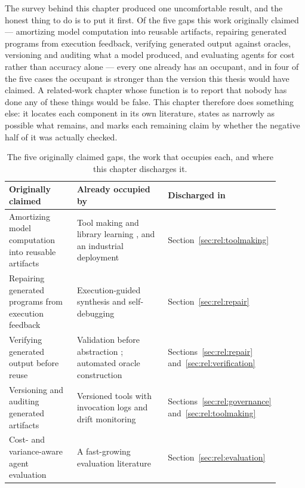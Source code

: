 The survey behind this chapter produced one uncomfortable result, and the honest thing to do
is to put it first. Of the five gaps this work originally claimed --- amortizing model
computation into reusable artifacts, repairing generated programs from execution feedback,
verifying generated output against oracles, versioning and auditing what a model produced,
and evaluating agents for cost rather than accuracy alone --- every one already has an
occupant, and in four of the five cases the occupant is stronger than the version this thesis
would have claimed. A related-work chapter whose function is to report that nobody has done
any of these things would be false. This chapter therefore does something else: it locates
each component in its own literature, states as narrowly as possible what remains, and marks
each remaining claim by whether the negative half of it was actually checked.

\begin{table}[htbp]
\centering
\caption{The five originally claimed gaps, the work that occupies each, and where this
chapter discharges it.}
\label{tab:rel:occupied}
\begin{tabular}{p{0.26\linewidth}p{0.36\linewidth}p{0.28\linewidth}}
\hline
\textbf{Originally claimed} & \textbf{Already occupied by} & \textbf{Discharged in} \\
\hline
Amortizing model computation into reusable artifacts & Tool making and library learning
\cite{cai2024latm,wang2024voyager,wang2024trove,yuan2024craft,stengeleskin2024regal}, and an
industrial deployment \cite{kujanpaa2026toolmaking} & Section~\ref{sec:rel:toolmaking} \\
Repairing generated programs from execution feedback & Execution-guided synthesis and
self-debugging \cite{shinn2023reflexion,chen2024selfdebug,zhong2024ldb,ridnik2024alphacodium}
& Section~\ref{sec:rel:repair} \\
Verifying generated output before reuse & Validation before abstraction
\cite{yuan2024craft,wang2024trove}; automated oracle construction
\cite{prasad2025utgen,chen2025revisitselfdebug} & Sections~\ref{sec:rel:repair}
and~\ref{sec:rel:verification} \\
Versioning and auditing generated artifacts & Versioned tools with invocation logs and drift
monitoring \cite{kujanpaa2026toolmaking} & Sections~\ref{sec:rel:governance}
and~\ref{sec:rel:toolmaking} \\
Cost- and variance-aware agent evaluation & A fast-growing evaluation literature
\cite{erol2025costofpass,kim2026dynamicreasoning,yao2025taubench,ma2026maestro,rabanser2026reliability}
& Section~\ref{sec:rel:evaluation} \\
\hline
\end{tabular}
\end{table}

